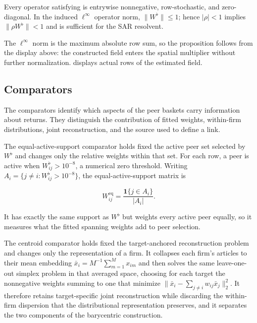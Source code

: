 \begin{proposition}\label{thm:wflat-sar-gate}
  Every operator satisfying  is entrywise nonnegative,
  row-stochastic, and zero-diagonal. In the induced $\ell^\infty$ operator
  norm, $\lVert W^\flat\rVert\leq1$; hence $|\rho|<1$ implies
  $\lVert\rho W^\flat\rVert<1$ and is sufficient for the SAR resolvent.
\end{proposition}

The $\ell^\infty$ norm is the maximum absolute row sum, so the proposition
follows from the display above: the constructed field enters the spatial
multiplier without further normalization.
 displays actual rows of the estimated field.

\subsection{Comparators}\label{sec:interaction-comparators}

The comparators identify which aspects of the peer baskets carry information
about returns.
They distinguish the contribution of fitted weights, within-firm
distributions, joint reconstruction, and the source used to define a link.

The equal-active-support comparator holds fixed the active peer set selected by
$W^\flat$ and changes only the relative weights within that set.
For each row, a peer is active when $W^\flat_{ij}>10^{-8}$, a numerical zero threshold.
Writing $A_i=\{j\ne i:W^\flat_{ij}>10^{-8}\}$, the
equal-active-support matrix is

\[
  W^{\mathrm{eq}}_{ij}
  =\frac{\mathbf{1}\{j\in A_i\}}{|A_i|}.
\]

It has exactly the same support as $W^\flat$ but weights every active peer
equally, so it measures what the fitted spanning weights add to peer
selection.

The centroid comparator holds fixed the target-anchored reconstruction problem
and changes only the representation of a firm.
It collapses each firm's articles to their mean embedding
$\bar x_i=M^{-1}\sum_{m=1}^M x_{im}$ and then solves the same
leave-one-out simplex problem in that averaged space, choosing for each target
the nonnegative weights summing to one that minimize
$\lVert\bar x_i-\sum_{j\ne i}w_{ij}\bar x_j\rVert_2^2$.
It therefore retains target-specific joint reconstruction while discarding the
within-firm dispersion that the distributional representation preserves, and it
separates the two components of the barycentric construction.

